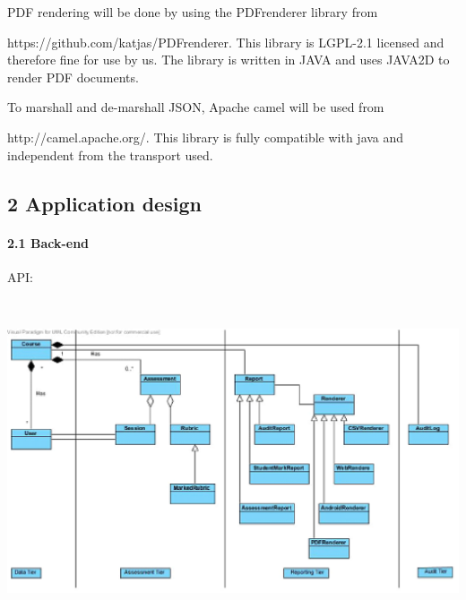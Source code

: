 \documentclass{article}
\begin{document}
\noindent PDF rendering will be done by using the PDFrenderer library from 

\noindent https://github.com/katjas/PDFrenderer. This library is LGPL-2.1 licensed and therefore fine for use by us. The library is written in JAVA and uses JAVA2D to render PDF documents.

\noindent 

\noindent To marshall and de-marshall JSON, Apache camel will be used from 

\noindent http://camel.apache.org/. This library is fully compatible with java and independent from the transport used.







\noindent 

\noindent 
\subsection{2  Application design}

 


\paragraph{2.1  Back-end}

API:

\includegraphics*[width=6.53in, height=3.78in, keepaspectratio=false]{image1}
\end{document}
